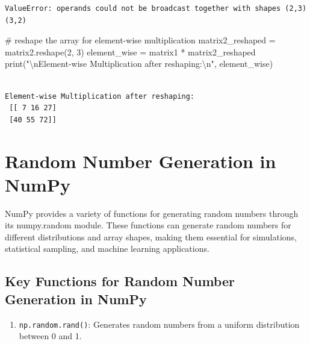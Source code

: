 \documentclass[
  letterpaper,
  DIV=11,
  numbers=noendperiod]{scrreprt}
\newenvironment{Shaded}{\begin{snugshade}}{\end{snugshade}}
\newcommand{\BuiltInTok}[1]{\textcolor[rgb]{0.00,0.23,0.31}{#1}}
\newcommand{\CharTok}[1]{\textcolor[rgb]{0.13,0.47,0.30}{#1}}
\newcommand{\CommentTok}[1]{\textcolor[rgb]{0.37,0.37,0.37}{#1}}
\newcommand{\DecValTok}[1]{\textcolor[rgb]{0.68,0.00,0.00}{#1}}
\newcommand{\NormalTok}[1]{\textcolor[rgb]{0.00,0.23,0.31}{#1}}
\newcommand{\OperatorTok}[1]{\textcolor[rgb]{0.37,0.37,0.37}{#1}}
\newcommand{\StringTok}[1]{\textcolor[rgb]{0.13,0.47,0.30}{#1}}
\providecommand{\tightlist}{%
  \setlength{\itemsep}{0pt}\setlength{\parskip}{0pt}}\usepackage{longtable,booktabs,array}
\begin{document}
\begin{verbatim}
ValueError: operands could not be broadcast together with shapes (2,3) (3,2) 
\end{verbatim}

\begin{Shaded}
\begin{Highlighting}[]
\CommentTok{\# reshape the array for element{-}wise multiplication}
\NormalTok{matrix2\_reshaped }\OperatorTok{=}\NormalTok{ matrix2.reshape(}\DecValTok{2}\NormalTok{, }\DecValTok{3}\NormalTok{)}
\NormalTok{element\_wise }\OperatorTok{=}\NormalTok{ matrix1 }\OperatorTok{*}\NormalTok{ matrix2\_reshaped}
\BuiltInTok{print}\NormalTok{(}\StringTok{"}\CharTok{\textbackslash{}n}\StringTok{Element{-}wise Multiplication after reshaping:}\CharTok{\textbackslash{}n}\StringTok{"}\NormalTok{, element\_wise)}
\end{Highlighting}
\end{Shaded}

\begin{verbatim}

Element-wise Multiplication after reshaping:
 [[ 7 16 27]
 [40 55 72]]
\end{verbatim}

\hypertarget{random-number-generation-in-numpy}{%
\section{Random Number Generation in
NumPy}\label{random-number-generation-in-numpy}}

NumPy provides a variety of functions for generating random numbers
through its numpy.random module. These functions can generate random
numbers for different distributions and array shapes, making them
essential for simulations, statistical sampling, and machine learning
applications.

\hypertarget{key-functions-for-random-number-generation-in-numpy}{%
\subsection{Key Functions for Random Number Generation in
NumPy}\label{key-functions-for-random-number-generation-in-numpy}}

\begin{enumerate}
\def\labelenumi{\arabic{enumi}.}
\tightlist
\item
  \texttt{np.random.rand()}: Generates random numbers from a uniform
  distribution between 0 and 1.
\end{enumerate}
\end{document}
